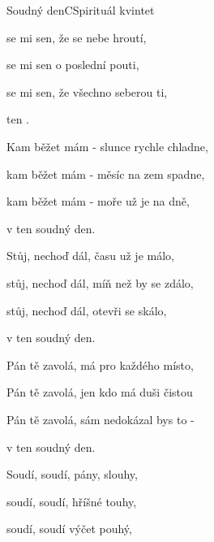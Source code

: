 \begin{song}{Soudný den}{C}{Spirituál kvintet}

\begin{SBVerse}

 se mi sen, že se nebe hroutí,

 se mi sen o poslední pouti,

 se mi sen, že všechno seberou ti,

 ten  .

\end{SBVerse}

\begin{SBVerse}

Kam běžet mám - slunce rychle chladne,

kam běžet mám - měsíc na zem spadne,

kam běžet mám - moře už je na dně,

v ten soudný den.

\end{SBVerse}

\begin{SBVerse}

Stůj, nechoď dál, času už je málo,

stůj, nechoď dál, míň než by se zdálo,

stůj, nechoď dál, otevři se skálo,

v ten soudný den.

\end{SBVerse}

\begin{SBVerse}

Pán tě zavolá, má pro každého místo,

Pán tě zavolá, jen kdo má duši čistou

Pán tě zavolá, sám nedokázal bys to -

v ten soudný den.

\end{SBVerse}

\begin{SBChorus}

Soudí, soudí, pány, slouhy,

soudí, soudí, hříšné touhy,

soudí, soudí výčet pouhý,

\end{SBChorus}

\begin{SBChorus*}


\end{SBChorus*}
\end{song}
